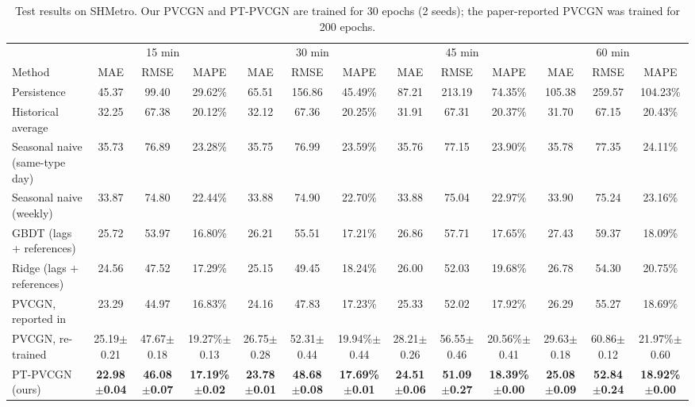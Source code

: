 \begin{table}[t]
\centering
\caption{Test results on SHMetro. Our PVCGN and PT-PVCGN are trained for 30 epochs (2 seeds); the paper-reported PVCGN was trained for 200 epochs.}
\label{tab:sh}
\scriptsize
\setlength{\tabcolsep}{3pt}
\begin{tabular}{lcccccccccccc}
\toprule
 & \multicolumn{3}{c}{15 min} & \multicolumn{3}{c}{30 min} & \multicolumn{3}{c}{45 min} & \multicolumn{3}{c}{60 min} \\
\cmidrule(lr){2-4} \cmidrule(lr){5-7} \cmidrule(lr){8-10} \cmidrule(lr){11-13}
Method & MAE & RMSE & MAPE & MAE & RMSE & MAPE & MAE & RMSE & MAPE & MAE & RMSE & MAPE \\
\midrule
Persistence & 45.37 & 99.40 & 29.62\% & 65.51 & 156.86 & 45.49\% & 87.21 & 213.19 & 74.35\% & 105.38 & 259.57 & 104.23\% \\
Historical average & 32.25 & 67.38 & 20.12\% & 32.12 & 67.36 & 20.25\% & 31.91 & 67.31 & 20.37\% & 31.70 & 67.15 & 20.43\% \\
Seasonal naive (same-type day) & 35.73 & 76.89 & 23.28\% & 35.75 & 76.99 & 23.59\% & 35.76 & 77.15 & 23.90\% & 35.78 & 77.35 & 24.11\% \\
Seasonal naive (weekly) & 33.87 & 74.80 & 22.44\% & 33.88 & 74.90 & 22.70\% & 33.88 & 75.04 & 22.97\% & 33.90 & 75.24 & 23.16\% \\
GBDT (lags + references) & 25.72 & 53.97 & 16.80\% & 26.21 & 55.51 & 17.21\% & 26.86 & 57.71 & 17.65\% & 27.43 & 59.37 & 18.09\% \\
Ridge (lags + references) & 24.56 & 47.52 & 17.29\% & 25.15 & 49.45 & 18.24\% & 26.00 & 52.03 & 19.68\% & 26.78 & 54.30 & 20.75\% \\
\midrule
PVCGN, reported in~\cite{liu2022pvcgn} & 23.29 & 44.97 & 16.83\% & 24.16 & 47.83 & 17.23\% & 25.33 & 52.02 & 17.92\% & 26.29 & 55.27 & 18.69\% \\
PVCGN, re-trained & 25.19\tiny{$\pm$0.21} & 47.67\tiny{$\pm$0.18} & 19.27\%\tiny{$\pm$0.13} & 26.75\tiny{$\pm$0.28} & 52.31\tiny{$\pm$0.44} & 19.94\%\tiny{$\pm$0.44} & 28.21\tiny{$\pm$0.26} & 56.55\tiny{$\pm$0.46} & 20.56\%\tiny{$\pm$0.41} & 29.63\tiny{$\pm$0.18} & 60.86\tiny{$\pm$0.12} & 21.97\%\tiny{$\pm$0.60} \\
\midrule
PT-PVCGN (ours) & \textbf{22.98\tiny{$\pm$0.04}} & \textbf{46.08\tiny{$\pm$0.07}} & \textbf{17.19\%\tiny{$\pm$0.02}} & \textbf{23.78\tiny{$\pm$0.01}} & \textbf{48.68\tiny{$\pm$0.08}} & \textbf{17.69\%\tiny{$\pm$0.01}} & \textbf{24.51\tiny{$\pm$0.06}} & \textbf{51.09\tiny{$\pm$0.27}} & \textbf{18.39\%\tiny{$\pm$0.00}} & \textbf{25.08\tiny{$\pm$0.09}} & \textbf{52.84\tiny{$\pm$0.24}} & \textbf{18.92\%\tiny{$\pm$0.00}} \\
\bottomrule
\end{tabular}
\end{table}